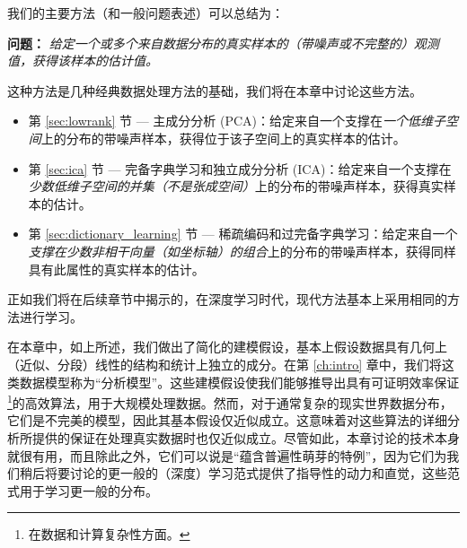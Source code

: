 \documentclass[../../book-main.tex]{subfiles}
\begin{document}
我们的主要方法（和一般问题表述）可以总结为：
\begin{tcolorbox}\centering
    \textbf{问题：} \textit{给定一个或多个来自数据分布的真实样本的（带噪声或不完整的）观测值，获得该样本的估计值。}
\end{tcolorbox}
这种方法是几种经典数据处理方法的基础，我们将在本章中讨论这些方法。
\begin{itemize}
    \item 第 \ref{sec:lowrank} 节 --- 主成分分析 (PCA)：给定来自一个支撑在\textit{一个低维子空间}上的分布的带噪声样本，获得位于该子空间上的真实样本的估计。
    \item 第 \ref{sec:ica} 节 --- 完备字典学习和独立成分分析 (ICA)：给定来自一个支撑在\textit{少数低维子空间的并集（\textit{不是}张成空间）}上的分布的带噪声样本，获得真实样本的估计。
    \item 第 \ref{sec:dictionary_learning} 节 --- 稀疏编码和过完备字典学习：给定来自一个\textit{支撑在少数非相干向量（如坐标轴）的组合}上的分布的带噪声样本，获得同样具有此属性的真实样本的估计。
\end{itemize}
正如我们将在后续章节中揭示的，在深度学习时代，现代方法基本上采用相同的方法进行学习。

在本章中，如上所述，我们做出了简化的建模假设，基本上假设数据具有几何上（近似、分段）线性的结构和统计上独立的成分。在第 \ref{ch:intro} 章中，我们将这类数据模型称为“分析模型”。这些建模假设使我们能够推导出具有可证明效率保证\footnote{在数据和计算复杂性方面。}的高效算法，用于大规模处理数据。然而，对于通常复杂的现实世界数据分布，它们是不完美的模型，因此其基本假设仅近似成立。这意味着对这些算法的详细分析所提供的保证在处理真实数据时也仅近似成立。尽管如此，本章讨论的技术本身就很有用，而且除此之外，它们可以说是“蕴含普遍性萌芽的特例”，因为它们为我们稍后将要讨论的更一般的（深度）学习范式提供了指导性的动力和直觉，这些范式用于学习更一般的分布。%


\end{document}
